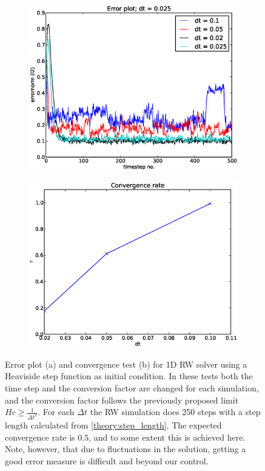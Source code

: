 \begin{figure}[h]
 \centering
\begin{subfigure}[t]{0.49\textwidth}
 \includegraphics[width=\textwidth]{../results/experiment_01052014_1615_Redoing_RW_tests/results/errorplot.eps}
 \caption{}
 \label{ConvergenceTestRW:dt:errorplot}
\end{subfigure}
 \begin{subfigure}[t]{0.49\textwidth}
 \includegraphics[width=\textwidth]{../results/experiment_01052014_1615_Redoing_RW_tests/results/ConvergenceTest.eps}
  \caption{}
 \label{ConvergenceTestRW:dt:convergence}
\end{subfigure}
\caption[]{Error plot (a) and convergence test (b) for 1D RW solver using a Heaviside step function as initial condition. In these tests both the time step and the conversion factor are changed for each simulation, and the conversion factor follows the previously proposed limit $Hc\geq\frac{1}{\Delta t^2}$. For each $\Delta t$ the RW simulation does 250 steps with a step length calculated from \eqref{theory:step_length}. The expected convergence rate is $0.5$, and to some extent this is achieved here. Note, however, that due to fluctuations in the solution, getting a good error measure is difficult and beyond our control.}
 \label{ConvergenceTestRW:dt}
\end{figure}
